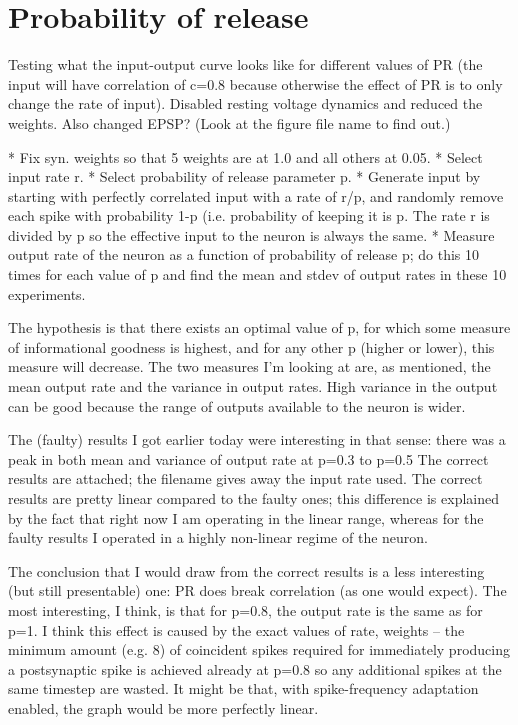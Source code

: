 \documentclass[a4paper,12pt]{report}
\theoremstyle{definition}
\begin{document}
\clearpage %
\section{Probability of release}

Testing what the input-output curve looks like for different values of PR (the input will have correlation of c=0.8 because otherwise the effect of PR is to only change the rate of input).
Disabled resting voltage dynamics and reduced the weights. Also changed EPSP? (Look at the figure file name to find out.)

* Fix syn. weights so that 5 weights are at 1.0 and all others at 0.05.
* Select input rate r.
* Select probability of release parameter p.
* Generate input by starting with perfectly correlated input with a rate of r/p, and randomly remove each spike with probability 1-p (i.e. probability of keeping it is p. The rate r is divided by p so the effective input to the neuron is always the same.
* Measure output rate of the neuron as a function of probability of release p; do this 10 times for each value of p and find the mean and stdev of output rates in these 10 experiments.

The hypothesis is that there exists an optimal value of p, for which some measure of informational goodness is highest, and for any other p (higher or lower), this measure will decrease.
The two measures I'm looking at are, as mentioned, the mean output rate and the variance in output rates. High variance in the output can be good because the range of outputs available to the neuron is wider.

The (faulty) results I got earlier today were interesting in that sense: there was a peak in both mean and variance of output rate at p=0.3 to p=0.5 The correct results are attached; the filename gives away the input rate used. The correct results are pretty linear compared to the faulty ones; this difference is explained by the fact that right now I am operating in the linear range, whereas for the faulty results I operated in a highly non-linear regime of the neuron.

The conclusion that I would draw from the correct results is a less interesting (but still presentable) one: PR does break correlation (as one would expect). The most interesting, I think, is that for p=0.8, the output rate is the same as for p=1.
I think this effect is caused by the exact values of {rate, weights} -- the minimum amount (e.g. 8) of coincident spikes required for immediately producing a postsynaptic spike is achieved already at p=0.8 so any additional spikes at the same timestep are wasted. It might be that, with spike-frequency adaptation enabled, the graph would be more perfectly linear.
\end{document}
